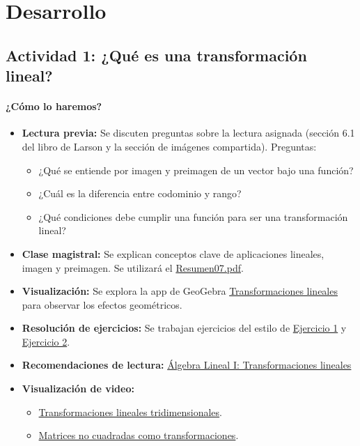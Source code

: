 \documentclass[a4,11pt]{aleph-notas}
\begin{document}
\section*{Desarrollo}

\subsection*{Actividad 1: ¿Qué es una transformación lineal?}

\paragraph{¿Cómo lo haremos?}  
\begin{itemize}[leftmargin=*]
    \item \textbf{Lectura previa:} Se discuten preguntas sobre la lectura asignada (sección 6.1 del libro de Larson y la sección de imágenes compartida). Preguntas:
    \begin{itemize}
        \item ¿Qué se entiende por imagen y preimagen de un vector bajo una función?
        \item ¿Cuál es la diferencia entre codominio y rango?
        \item ¿Qué condiciones debe cumplir una función para ser una transformación lineal?
    \end{itemize}
    \item \textbf{Clase magistral:} Se explican conceptos clave de aplicaciones lineales, imagen y preimagen. Se utilizará el \href{https://fcena-puce.github.io/AlgLinealyGeomAnalitica-05-N0068/2-Resumenes/Resumen07.pdf}{Resumen07.pdf}.
    \item \textbf{Visualización:} Se explora la app de GeoGebra \href{https://www.geogebra.org/m/keG7vsZS}{Transformaciones lineales} para observar los efectos geométricos.
    \item \textbf{Resolución de ejercicios:} Se trabajan ejercicios del estilo de \href{https://alephsub0.org/pregrado/ejercicios-de-algebra-lineal/david-escobar/determinar-si-una-funcion-es-aplicacion-lineal-2/}{Ejercicio 1} y \href{https://alephsub0.org/pregrado/ejercicios-de-algebra-lineal/juan-andrade/determinar-si-una-funcion-es-aplicacion-lineal/}{Ejercicio 2}.
    \item \textbf{Recomendaciones de lectura:} \href{https://blog.nekomath.com/lineal-i-transformaciones-lineales/}{Álgebra Lineal I: Transformaciones lineales}
    \item \textbf{Visualización de video:} 
    \begin{itemize}
        \item \href{https://youtu.be/rHLEWRxRGiM?si=NLl2s2yq4yYzMbE3}{Transformaciones lineales tridimensionales}.
        \item \href{https://youtu.be/v8VSDg_WQlA?si=PRo-lCD-QB51Ha1H}{Matrices no cuadradas como transformaciones}.
    \end{itemize}
\end{itemize}
\end{document}
